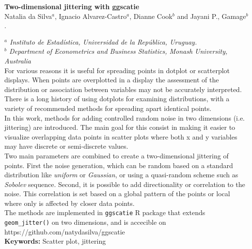 \documentclass[a4paper,12pt]{article}
\begin{document}
{\Large\bf Two-dimensional jittering with ggscatie }\\[4mm]

Natalia da Silva$^a$, Ignacio Alvarez-Castro$^a$, Dianne Cook$^b$ and Jayani P., Gamage$^b$.

\vspace{1cm}

{\small \em $^a$ Instituto de Estadística, Universidad de la República, Uruguay. \\


$^b$ Department of Econometrics and Business Statistics, Monash University, Australia }\\[5mm]

For various reasons it is useful for spreading points in dotplot or scatterplot displays. When points are overplotted in a display the assessment of the distribution or association between variables may not be accurately interpreted. There is a long history of using dotplots for examining distributions, with a variety of recommended methods for spreading apart identical points.
\\


In this work, methods for adding controlled random noise in two dimensions (i.e. jittering) are introduced. The main goal for this consist in making it easier to visualize overlapping data points in scatter plots where both x and y variables may have discrete or semi-discrete values.
\\

Two main parameters are combined to create a two-dimensional jittering of points. First the noise generation, which can be random based on a standard distribution like \textit{uniform} or \textit{Gaussian}, or using a quasi-random scheme such as \textit{Sobolev} sequence. Second, it is possible to add directionality or correlation to the noise. This correlation is set based on a global pattern of the points or local where only is affected by closer data points.
\\

The methods are implemented in \texttt{ggscatie} R package that extends \texttt{geom\_jitter()} on two dimensions, and is accecible on https://github.com/natydasilva/ggscatie
\\

\textbf{Keywords:} Scatter plot, jittering

\end{document}
